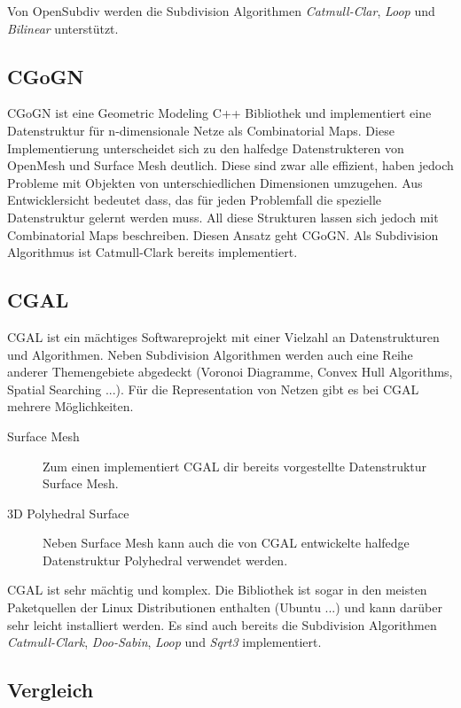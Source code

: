 Von OpenSubdiv werden die Subdivision Algorithmen \emph{Catmull-Clar}, \emph{Loop} und \emph{Bilinear} unterstützt. \cite{Pixar.27.07.2015}

\subsection{CGoGN}

CGoGN ist eine Geometric Modeling C++ Bibliothek und implementiert eine Datenstruktur für n-dimensionale Netze als Combinatorial Maps.
Diese Implementierung unterscheidet sich zu den halfedge Datenstrukteren von OpenMesh und Surface Mesh deutlich.
Diese sind zwar alle effizient, haben jedoch Probleme mit Objekten von unterschiedlichen Dimensionen umzugehen.
Aus Entwicklersicht bedeutet dass, das für jeden Problemfall die spezielle Datenstruktur gelernt werden muss.
All diese Strukturen lassen sich jedoch mit Combinatorial Maps beschreiben.
Diesen Ansatz geht CGoGN. Als Subdivision Algorithmus ist Catmull-Clark bereits implementiert. \cite{CGoGN.27.07.2015}

\subsection{\acf{CGAL}}

\ac{CGAL} ist ein mächtiges Softwareprojekt mit einer Vielzahl an Datenstrukturen und Algorithmen.
Neben Subdivision Algorithmen werden auch eine Reihe anderer Themengebiete abgedeckt (Voronoi Diagramme, Convex Hull Algorithms, Spatial Searching ...).
Für die Representation von Netzen gibt es bei \acs{CGAL} mehrere Möglichkeiten.

\begin{description}
 \item[Surface Mesh] Zum einen implementiert \acs{CGAL} dir bereits vorgestellte Datenstruktur Surface Mesh.
 \item[3D Polyhedral Surface] Neben Surface Mesh kann auch die von \acs{CGAL} entwickelte halfedge Datenstruktur Polyhedral verwendet werden.
\end{description}

\acs{CGAL} ist sehr mächtig und komplex. Die Bibliothek ist sogar in den meisten Paketquellen der Linux Distributionen enthalten (Ubuntu ...)
und kann darüber sehr leicht installiert werden.
Es sind auch bereits die Subdivision Algorithmen \emph{Catmull-Clark}, \emph{Doo-Sabin}, \emph{Loop} und \emph{Sqrt3} implementiert. \cite{CGAL.27.07.2015}

\subsection{Vergleich}

